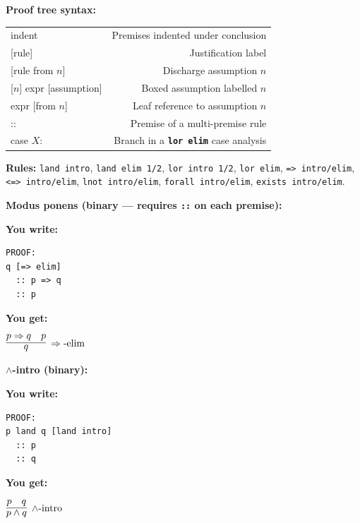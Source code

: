 \documentclass[10pt,landscape,a4paper]{article}
\newcommand{\kw}[1]{\texttt{\bfseries #1}}
\newenvironment{exwrite}%
  {\par\nobreak\noindent\scriptsize\textbf{You write:}\par\nobreak\vspace{0pt}\scriptsize}%
  {\vspace{1pt}\nobreak}
\newenvironment{exget}%
  {\par\nobreak\noindent\scriptsize\textbf{You get:}\par\nobreak\vspace{0pt}\small}%
  {\par\vspace{3pt}}
\begin{document}
\begin{multicols}{2}
\smallskip
{}
\textbf{Proof tree syntax:}

\begin{tabularx}{\columnwidth}{LR}
\textrm{indent}          & Premises indented under conclusion \\
{[rule]}                  & Justification label \\
{[rule from $n$]}         & Discharge assumption $n$ \\
{[$n$] expr [assumption]} & Boxed assumption labelled $n$ \\
expr [from $n$]           & Leaf reference to assumption $n$ \\
::                        & Premise of a multi-premise rule \\
case $X$:                 & Branch in a \kw{lor elim} case analysis \\
\end{tabularx}

{\footnotesize\textbf{Rules:} \texttt{land intro}, \texttt{land elim 1/2}, \texttt{lor intro 1/2}, \texttt{lor elim}, \texttt{=> intro/elim}, \texttt{<=> intro/elim}, \texttt{lnot intro/elim}, \texttt{forall intro/elim}, \texttt{exists intro/elim}.}

\smallskip
{}
\textbf{Modus ponens (binary --- requires \texttt{::} on each premise):}

\begin{exwrite}%
\begin{verbatim}
PROOF:
q [=> elim]
  :: p => q
  :: p
\end{verbatim}
\end{exwrite}
\begin{exget}%
\begin{center}
$\infer[\Rightarrow\textrm{-elim}]{q}{p \Rightarrow q & p}$
\end{center}
\end{exget}

\textbf{$\land$-intro (binary):}

\begin{exwrite}%
\begin{verbatim}
PROOF:
p land q [land intro]
  :: p
  :: q
\end{verbatim}
\end{exwrite}
\begin{exget}%
\begin{center}
$\infer[\land\textrm{-intro}]{p \land q}{p & q}$
\end{center}
\end{exget}


\end{multicols}
\end{document}
